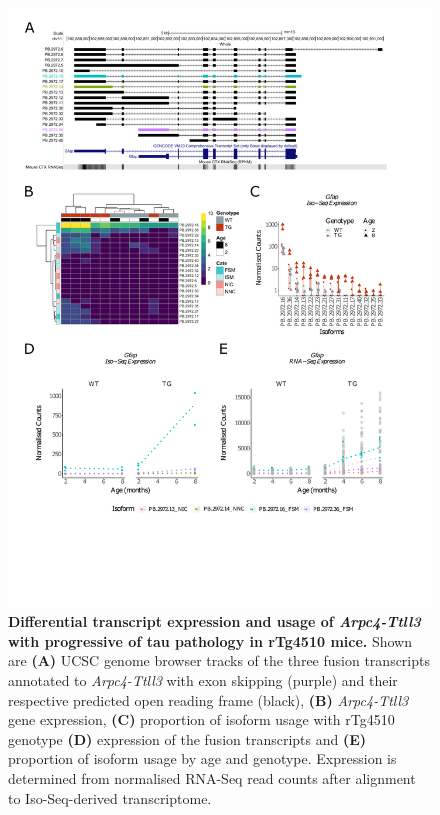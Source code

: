 \begin{figure}[!htp]
	\centering
	\includegraphics[page=7,trim={1.5cm 1.5cm 2cm 1cm}, scale = 0.80]{Figures/Ch5_DiffPlots.pdf}
	\captionsetup{width=0.95\textwidth}
	\caption[Differential \textit{Arpc4-Ttll3} transcript expression and usage]%
	{\textbf{Differential transcript expression and usage of \textit{Arpc4-Ttll3} with progressive of tau pathology in rTg4510 mice.} Shown are \textbf{(A)} UCSC genome browser tracks of the three fusion transcripts annotated to \textit{Arpc4-Ttll3} with exon skipping (purple) and their respective predicted open reading frame (black), \textbf{(B)} \textit{Arpc4-Ttll3} gene expression, \textbf{(C)} proportion of isoform usage with rTg4510 genotype \textbf{(D)} expression of the fusion transcripts and \textbf{(E)} proportion of isoform usage by age and genotype. Expression is determined from normalised RNA-Seq read counts after alignment to Iso-Seq-derived transcriptome.} 
	\label{fig:DIU_Arpc4}
\end{figure}

